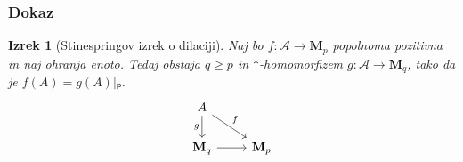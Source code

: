\documentclass[slovene]{beamer}
\newtheorem{izrek}[theorem]{Izrek}
\newcommand{\mc}[1]{\mathcal{#1}}
\newcommand{\M}[1][]{\mathbf{M}_{#1}}
\begin{document}
\begin{frame}[fragile]
    \frametitle{Dokaz}

    \begin{izrek}[Stinespringov izrek o dilaciji]
        Naj bo \(f : \mc A → \M[p]\) popolnoma pozitivna in naj ohranja enoto. Tedaj obstaja \(q ≥ p\) in \(*\)-homomorfizem \(g : \mc A → \M[q]\), tako da je \(f(A) = g(A)|ₚ\).
        \[\begin{tikzcd}
            A \\
            {\M[q]} & {\M[p]}
            \arrow[from=2-1, to=2-2]
            \arrow["g"', from=1-1, to=2-1]
            \arrow["f", from=1-1, to=2-2]
        \end{tikzcd}\]
    \end{izrek}


\end{frame}

\end{document}
